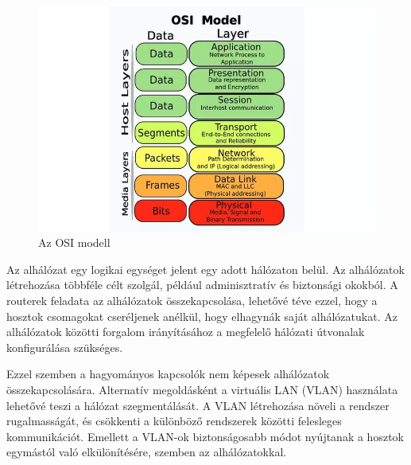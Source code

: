 \begin{figure}[H]
	\centering
	\includegraphics[width=150mm, keepaspectratio]{figures/osi_modell.jpg}
	\caption{Az OSI modell}
	\label {fig:osi_modell}
\end{figure}

Az alhálózat egy logikai egységet jelent egy adott hálózaton belül. 
Az alhálózatok létrehozása többféle célt szolgál, például adminisztratív és biztonsági okokból. 
A routerek feladata az alhálózatok összekapcsolása, lehetővé téve ezzel, hogy a hosztok csomagokat 
cseréljenek anélkül, hogy elhagynák saját alhálózatukat. 
Az alhálózatok közötti forgalom irányításához a megfelelő hálózati útvonalak konfigurálása szükséges.

Ezzel szemben a hagyományos kapcsolók nem képesek alhálózatok összekapcsolására. 
Alternatív megoldásként a virtuális LAN (VLAN) használata lehetővé teszi a hálózat szegmentálását. 
A VLAN létrehozása növeli a rendszer rugalmasságát, és csökkenti a különböző rendszerek közötti felesleges kommunikációt. 
Emellett a VLAN-ok biztonságosabb módot nyújtanak a hosztok egymástól való elkülönítésére, szemben az alhálózatokkal.

